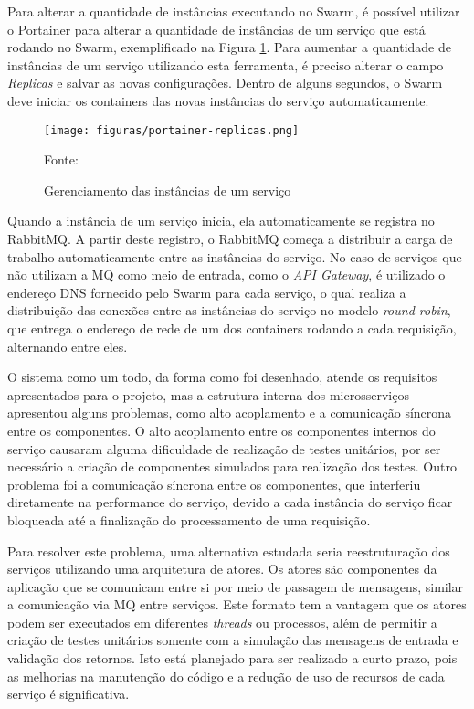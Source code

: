 Para alterar a quantidade de instâncias executando no Swarm, é possível utilizar
o Portainer para alterar a quantidade de instâncias de um serviço que está
rodando no Swarm, exemplificado na Figura \ref{fig:portainer-replicas}.
Para aumentar a quantidade de instâncias de um serviço utilizando esta
ferramenta, é preciso alterar o campo \emph{Replicas} e salvar as novas
configurações. Dentro de alguns segundos, o Swarm deve iniciar os containers
das novas instâncias do serviço automaticamente.

\begin{figure}[H]
	\centering
	\caption{Gerenciamento das instâncias de um serviço}
	\texttt{[image: figuras/portainer-replicas.png]}

	\label{fig:portainer-replicas}
	\footnotesize Fonte: \fonteOAutor
\end{figure}

Quando a instância de um serviço inicia, ela automaticamente se registra
no RabbitMQ. A partir deste registro, o RabbitMQ começa a distribuir a carga
de trabalho automaticamente entre as instâncias do serviço. No caso de
serviços que não utilizam a \ac{MQ} como meio de entrada, como o
\emph{API Gateway}, é utilizado o endereço \ac{DNS} fornecido pelo Swarm
para cada serviço, o qual realiza a distribuição das conexões entre as
instâncias do serviço no modelo \emph{round-robin}, que entrega o
endereço de rede de um dos containers rodando a cada requisição, alternando
entre eles.

O sistema como um todo, da forma como foi desenhado, atende os requisitos
apresentados para o projeto, mas a estrutura interna dos microsserviços
apresentou alguns problemas, como alto acoplamento e a comunicação síncrona
entre os componentes. O alto acoplamento entre os componentes internos do
serviço causaram alguma dificuldade de realização de testes unitários, por
ser necessário a criação de componentes simulados para realização dos testes.
Outro problema foi a comunicação síncrona entre os componentes, que
interferiu diretamente na performance do serviço, devido a cada instância do
serviço ficar bloqueada até a finalização do processamento de uma requisição.

Para resolver este problema, uma alternativa estudada seria reestruturação
dos serviços utilizando uma arquitetura de atores. Os atores são componentes
da aplicação que se comunicam entre si por meio de passagem de mensagens,
similar a comunicação via \ac{MQ} entre serviços. Este formato tem a vantagem
que os atores podem ser executados em diferentes \emph{threads} ou processos,
além de permitir a criação de testes unitários somente com a simulação das
mensagens de entrada e validação dos retornos. Isto está planejado para ser
realizado a curto prazo, pois as melhorias na manutenção do código e a
redução de uso de recursos de cada serviço é significativa.

